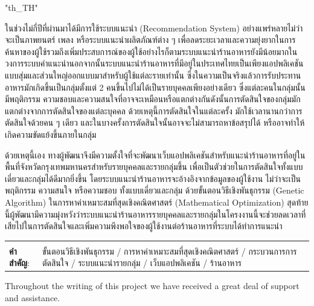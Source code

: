 \documentclass[12pt,oneside,openright,a4paper]{cpe-english-project}
\begin{document}
{
\XeTeXlinebreaklocale "th_TH"	
\thaifont
\thaiabstract

ในช่วงไม่กี่ปีที่ผ่านมาได้มีการใช้ระบบแนะนำ (Recommendation System) อย่างแพร่หลายไม่ว่าจะเป็นภาพยนตร์ เพลง หรือระบบแนะนำผลิตภัณฑ์ต่าง ๆ เพื่อลดระยะเวลาและความยุ่งยากในการค้นหาของผู้ใช้รวมถึงเพิ่มประสบการณ์ของผู้ใช้อย่างไรก็ตามระบบแนะนำร้านอาหารยังมีน้อยมากในวงการระบบคำแนะนำนอกจากนั้นระบบแนะนำร้านอาหารที่มีอยู่ในประเทศไทยเป็นเพียงแอปพลิเคชันแบบสุ่มและส่วนใหญ่ออกแบบมาสำหรับผู้ใช้แต่ละรายเท่านั้น ซึ่งในความเป็นจริงแล้วการรับประทานอาหารมักเกิดขึ้นเป็นกลุ่มตั้งแต่ 2 คนขึ้นไปไม่ได้เป็นรายบุคคลเพียงอย่างเดียว ซึ่งแต่ละคนในกลุ่มนั้นมีพฤติกรรม ความชอบและความสนใจที่อาจจะเหมือนหรือแตกต่างกันดังนั้นการตัดสินใจของกลุ่มมักแตกต่างจากการตัดสินใจของแต่ละบุคคล ด้วยเหตุนี้การตัดสินใจในแต่ละครั้ง มักใช้เวลานานกว่าการตัดสินใจด้วยคน ๆ เดียว และในบางครั้งการตัดสินใจนั้นอาจจะไม่สามารถหาข้อสรุปได้ หรืออาจทําให้เกิดความขัดแย้งขึ้นภายในกลุ่ม

ด้วยเหตุนี้เอง ทางผู้พัฒนาจึงมีความตั้งใจที่จะพัฒนาเว็บแอปพลิเคชันสำหรับแนะนำร้านอาหารที่อยู่ในพื้นที่จังหวัดกรุงเทพมหานครสำหรับรายบุคคลและรายกลุ่มขึ้น เพื่อเป็นตัวช่วยในการตัดสินใจทั้งแบบเดี่ยวและกลุ่มได้ดีมากยิ่งขึ้น โดยระบบแนะนําร้านอาหารจะอ้างอิงจากข้อมูลของผู้ใช้งาน ไม่ว่าจะเป็นพฤติกรรม ความสนใจ หรือความชอบ ทั้งแบบเดี่ยวและกลุ่ม ด้วยขั้นตอนวิธีเชิงพันธุกรรม (Genetic Algorithm) ในการหาค่าเหมาะสมที่สุดเชิงคณิตศาสตร์ (Mathematical Optimization) สุดท้ายนี้ผู้พัฒนามีความมุ่งหวังว่าระบบแนะนําร้านอาหารรายบุคคลและรายกลุ่มในโครงงานนี้จะช่วยลดเวลาที่เสียไปในการตัดสินใจและเพิ่มความพึงพอใจของผู้ใช้งานต่อร้านอาหารที่ระบบได้ทำการแนะนำ


\begin{flushleft}
\begin{tabular*}{\textwidth}{@{}lp{}}
 & \\

\textbf{คำสำคัญ}: & ขั้นตอนวิธีเชิงพันธุกรรม / การหาค่าเหมาะสมที่สุดเชิงคณิตศาสตร์ / กระบวนการการตัดสินใจ / ระบบแนะนำรายกลุ่ม / เว็บแอปพลิเคชัน / ร้านอาหาร
\end{tabular*}
\end{flushleft}
\endabstract
}

\preface
Throughout the writing of this project we have received a great deal of support and assistance.
\end{document}
